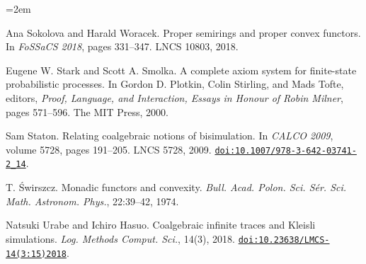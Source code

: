 \begin{list}{}{\leftmargin=2em}
\hypertarget{html:bib.bib28}{}
\item[]  [28]  Ana Sokolova and Harald Woracek.  Proper semirings and proper convex functors.  In \emph{FoSSaCS 2018}, pages 331–347. LNCS 10803, 2018.  
\hypertarget{html:bib.bib29}{}
\item[]  [29]  Eugene W. Stark and Scott A. Smolka.  A complete axiom system for finite-state probabilistic processes.  In Gordon D. Plotkin, Colin Stirling, and Mads Tofte, editors, \emph{Proof, Language, and Interaction, Essays in Honour of Robin Milner}, pages 571–596. The MIT Press, 2000.  
\hypertarget{html:bib.bib30}{}
\item[]  [30]  Sam Staton.  Relating coalgebraic notions of bisimulation.  In \emph{CALCO 2009}, volume 5728, pages 191–205. LNCS 5728, 2009.  \href{https://doi.org/10.1007/978-3-642-03741-2_14}{\nolinkurl{doi:10.1007/978-3-642-03741-2_14}}.  
\hypertarget{html:bib.bib31}{}
\item[]  [31]  T. Świrszcz.  Monadic functors and convexity.  \emph{Bull. Acad. Polon. Sci. Sér. Sci. Math. Astronom. Phys.}, 22:39–42, 1974.  
\hypertarget{html:bib.bib32}{}
\item[]  [32]  Natsuki Urabe and Ichiro Hasuo.  Coalgebraic infinite traces and Kleisli simulations.  \emph{Log. Methods Comput. Sci.}, 14(3), 2018.  \href{https://doi.org/10.23638/LMCS-14(3:15)2018}{\nolinkurl{doi:10.23638/LMCS-14(3:15)2018}}.  
 
\end{list}
 
